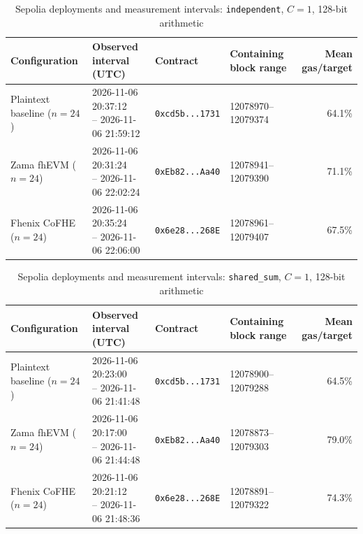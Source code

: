 \begin{table}[!t]
\caption{Sepolia deployments and measurement intervals: \texttt{independent}, \(C=1\), 128-bit arithmetic}
\label{tab:sepolia-experiment-deployments-concurrency-euint128-concurrency-w128-c1-independent}
\centering
\footnotesize
\setlength{\tabcolsep}{4pt}
\begin{tabular}{|l|l|l|l|r|}
\hline
\textbf{Configuration} &
\textbf{Observed interval (UTC)} &
\textbf{Contract} &
\textbf{Containing block range} &
\textbf{Mean gas/target} \\
\hline
Plaintext baseline (\(n=24\)) &
\shortstack[l]{2026-11-06 20:37:12 \\ -- 2026-11-06 21:59:12} &
\texttt{0xcd5b...1731} &
12078970--12079374 &
64.1\% \\
\hline
Zama fhEVM (\(n=24\)) &
\shortstack[l]{2026-11-06 20:31:24 \\ -- 2026-11-06 22:02:24} &
\texttt{0xEb82...Aa40} &
12078941--12079390 &
71.1\% \\
\hline
Fhenix CoFHE (\(n=24\)) &
\shortstack[l]{2026-11-06 20:35:24 \\ -- 2026-11-06 22:06:00} &
\texttt{0x6e28...268E} &
12078961--12079407 &
67.5\% \\
\hline
\end{tabular}
\end{table}

\begin{table}[!t]
\caption{Sepolia deployments and measurement intervals: \texttt{shared\_sum}, \(C=1\), 128-bit arithmetic}
\label{tab:sepolia-experiment-deployments-concurrency-euint128-concurrency-w128-c1-shared-sum}
\centering
\footnotesize
\setlength{\tabcolsep}{4pt}
\begin{tabular}{|l|l|l|l|r|}
\hline
\textbf{Configuration} &
\textbf{Observed interval (UTC)} &
\textbf{Contract} &
\textbf{Containing block range} &
\textbf{Mean gas/target} \\
\hline
Plaintext baseline (\(n=24\)) &
\shortstack[l]{2026-11-06 20:23:00 \\ -- 2026-11-06 21:41:48} &
\texttt{0xcd5b...1731} &
12078900--12079288 &
64.5\% \\
\hline
Zama fhEVM (\(n=24\)) &
\shortstack[l]{2026-11-06 20:17:00 \\ -- 2026-11-06 21:44:48} &
\texttt{0xEb82...Aa40} &
12078873--12079303 &
79.0\% \\
\hline
Fhenix CoFHE (\(n=24\)) &
\shortstack[l]{2026-11-06 20:21:12 \\ -- 2026-11-06 21:48:36} &
\texttt{0x6e28...268E} &
12078891--12079322 &
74.3\% \\
\hline
\end{tabular}
\end{table}

